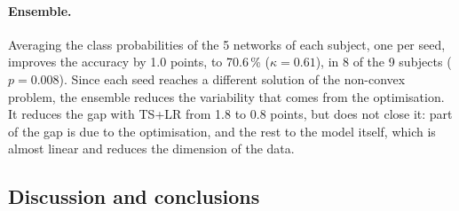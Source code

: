\paragraph{Ensemble.}
Averaging the class probabilities of the 5 networks of each subject, one per seed, improves the accuracy by 1.0 points, to 70.6\,\% ($\kappa = 0.61$), in 8 of the 9 subjects ($p = 0.008$). Since each seed reaches a different solution of the non-convex problem, the ensemble reduces the variability that comes from the optimisation. It reduces the gap with TS+LR from 1.8 to 0.8 points, but does not close it: part of the gap is due to the optimisation, and the rest to the model itself, which is almost linear and reduces the dimension of the data.

\subsection{Discussion and conclusions}
\label{sec:discussion}

